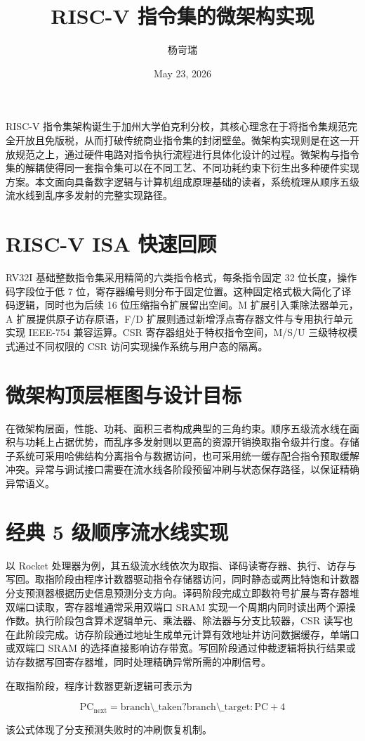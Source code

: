 \title{RISC-V 指令集的微架构实现}
\author{杨岢瑞}
\date{May 23, 2026}
\maketitle
RISC-V 指令集架构诞生于加州大学伯克利分校，其核心理念在于将指令集规范完全开放且免版税，从而打破传统商业指令集的封闭壁垒。微架构实现则是在这一开放规范之上，通过硬件电路对指令执行流程进行具体化设计的过程。微架构与指令集的解耦使得同一套指令集可以在不同工艺、不同功耗约束下衍生出多种硬件实现方案。本文面向具备数字逻辑与计算机组成原理基础的读者，系统梳理从顺序五级流水线到乱序多发射的完整实现路径。\par
\chapter{RISC-V ISA 快速回顾}
RV32I 基础整数指令集采用精简的六类指令格式，每条指令固定 32 位长度，操作码字段位于低 7 位，寄存器编号则分布于固定位置。这种固定格式极大简化了译码逻辑，同时也为后续 16 位压缩指令扩展留出空间。M 扩展引入乘除法器单元，A 扩展提供原子访存原语，F/D 扩展则通过新增浮点寄存器文件与专用执行单元实现 IEEE-754 兼容运算。CSR 寄存器组处于特权指令空间，M/S/U 三级特权模式通过不同权限的 CSR 访问实现操作系统与用户态的隔离。\par
\chapter{微架构顶层框图与设计目标}
在微架构层面，性能、功耗、面积三者构成典型的三角约束。顺序五级流水线在面积与功耗上占据优势，而乱序多发射则以更高的资源开销换取指令级并行度。存储子系统可采用哈佛结构分离指令与数据访问，也可采用统一缓存配合指令预取缓解冲突。异常与调试接口需要在流水线各阶段预留冲刷与状态保存路径，以保证精确异常语义。\par
\chapter{经典 5 级顺序流水线实现}
以 Rocket 处理器为例，其五级流水线依次为取指、译码读寄存器、执行、访存与写回。取指阶段由程序计数器驱动指令存储器访问，同时静态或两比特饱和计数器分支预测器根据历史信息预测分支方向。译码阶段完成立即数符号扩展与寄存器堆双端口读取，寄存器堆通常采用双端口 SRAM 实现一个周期内同时读出两个源操作数。执行阶段包含算术逻辑单元、乘法器、除法器与分支比较器，CSR 读写也在此阶段完成。访存阶段通过地址生成单元计算有效地址并访问数据缓存，单端口或双端口 SRAM 的选择直接影响访存带宽。写回阶段通过仲裁逻辑将执行结果或访存数据写回寄存器堆，同时处理精确异常所需的冲刷信号。\par
在取指阶段，程序计数器更新逻辑可表示为\par
$$ \text{PC}_{\text{next}} = \text{branch\textbackslash{}\_taken} ? \text{branch\textbackslash{}\_target} : \text{PC} + 4 $$\par
该公式体现了分支预测失败时的冲刷恢复机制。\par
